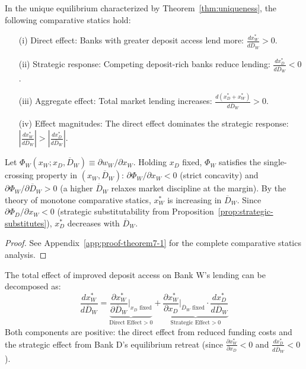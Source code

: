 \documentclass[12pt]{article}
\begin{document}
\begin{theorem}\label{thm:deposit-access}
In the unique equilibrium characterized by Theorem~\ref{thm:uniqueness}, the following comparative statics hold:
\begin{enumerate}
    \item[(i)] Direct effect: Banks with greater deposit access lend more: $\frac{dx_{W}^{*}}{d\overline{D}_{W}} > 0$.
    \item[(ii)] Strategic response: Competing deposit-rich banks reduce lending: $\frac{dx_{D}^{*}}{d\overline{D}_{W}} < 0$.
    \item[(iii)] Aggregate effect: Total market lending increases: $\frac{d(x_{D}^{*}+x_{W}^{*})}{d\overline{D}_{W}} > 0$.
    \item[(iv)] Effect magnitudes: The direct effect dominates the strategic response: $|\frac{dx_{W}^{*}}{d\overline{D}_{W}}| > |\frac{dx_{D}^{*}}{d\overline{D}_{W}}|$.
\end{enumerate}
\end{theorem}

\begin{remark}
Let $\Phi_W(x_W; x_D,\overline{D}_W)\equiv \partial w_W/\partial x_W$. Holding $x_D$ fixed, $\Phi_W$ satisfies the single-crossing property in $(x_W,\overline{D}_W)$: $\partial\Phi_W/\partial x_W<0$ (strict concavity) and $\partial\Phi_W/\partial\overline{D}_W>0$ (a higher $\overline{D}_W$ relaxes market discipline at the margin). By the theory of monotone comparative statics, $x_W^{*}$ is increasing in $\overline{D}_W$. Since $\partial\Phi_D/\partial x_W<0$ (strategic substitutability from Proposition~\ref{prop:strategic-substitutes}), $x_D^{*}$ decreases with $\overline{D}_W$.
\end{remark}

\begin{proof}
See Appendix~\ref{app:proof-theorem7-1} for the complete comparative statics analysis.
\end{proof}

\begin{proposition}\label{prop:decomposition}
The total effect of improved deposit access on Bank W's lending can be decomposed as:
\begin{equation}
    \frac{dx_{W}^{*}}{d\overline{D}_{W}} = \underbrace{\frac{\partial x_{W}^{*}}{\partial\overline{D}_{W}}\bigg|_{x_{D} \text{ fixed}}}_{\text{Direct Effect} > 0} + \underbrace{\frac{\partial x_{W}^{*}}{\partial x_{D}}\bigg|_{\overline{D}_{W} \text{ fixed}} \cdot \frac{dx_{D}^{*}}{d\overline{D}_{W}}}_{\text{Strategic Effect} > 0}
\end{equation}
Both components are positive: the direct effect from reduced funding costs and the strategic effect from Bank D's equilibrium retreat (since $\frac{\partial x_{W}^{*}}{\partial x_{D}} < 0$ and $\frac{dx_{D}^{*}}{d\overline{D}_{W}} < 0$).
\end{proposition}
\end{document}
